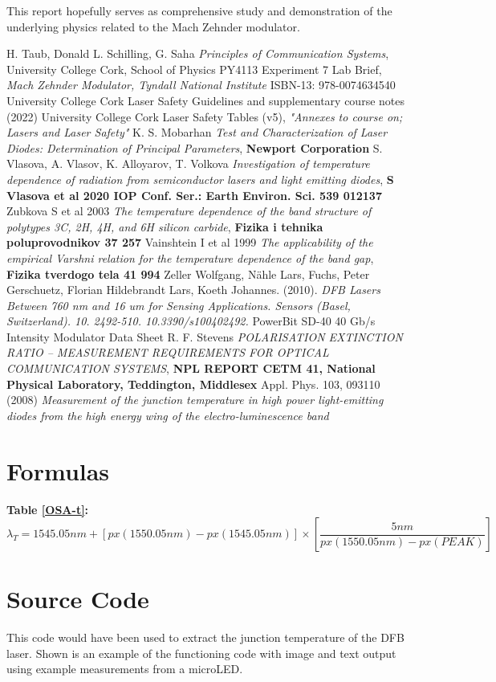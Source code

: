 \documentclass[12pt,a4paper]{report}
\begin{document}
This report hopefully serves as comprehensive study and demonstration of the underlying physics related to the Mach Zehnder modulator. 
\newpage
\vfill{}
\begin{thebibliography}{9}
 H. Taub, Donald L. Schilling, G. Saha \emph{Principles of Communication Systems}, 
 University College Cork, School of Physics PY4113 Experiment 7 Lab Brief, \emph{Mach Zehnder Modulator, Tyndall National Institute} ISBN-13: 978-0074634540
 University College Cork Laser Safety Guidelines and supplementary course notes (2022)
 University College Cork Laser Safety Tables (v5), \emph{"Annexes to course on; Lasers and Laser Safety"}
 K. S. Mobarhan \emph{Test and Characterization of Laser Diodes:
Determination of Principal Parameters}, \textbf{Newport Corporation}
 S. Vlasova, A. Vlasov, K. Alloyarov, T. Volkova \emph{Investigation of temperature dependence of
radiation from semiconductor lasers and light
emitting diodes}, \textbf{S Vlasova et al 2020 IOP Conf. Ser.: Earth Environ. Sci. 539 012137}
 Zubkova S et al 2003 \emph{The temperature dependence of the band structure of polytypes 3C, 2H,
4H, and 6H silicon carbide}, \textbf{Fizika i tehnika poluprovodnikov 37 257}
 Vainshtein I et al 1999 \emph{The applicability of the empirical Varshni relation for the temperature
dependence of the band gap}, \textbf{Fizika tverdogo tela 41 994}
 Zeller Wolfgang, Nähle Lars, Fuchs, Peter Gerschuetz, Florian  Hildebrandt Lars, Koeth Johannes. (2010). \emph{DFB Lasers Between 760 nm and 16 um for Sensing Applications. Sensors (Basel, Switzerland). 10. 2492-510. 10.3390/s100402492.}
 PowerBit SD-40 40 Gb/s Intensity Modulator Data Sheet
 R. F. Stevens \emph{POLARISATION EXTINCTION RATIO – MEASUREMENT
REQUIREMENTS FOR OPTICAL COMMUNICATION SYSTEMS}, \textbf{NPL REPORT CETM 41, National Physical Laboratory, Teddington, Middlesex}
 Appl. Phys. 103, 093110 (2008) \emph{Measurement of the junction temperature in high power light-emitting diodes from the high energy wing of the electro-luminescence band}
\end{thebibliography}
\newpage
\appendix
\chapter{Formulas}
\textbf{Table \ref{OSA-t}:}
\begin{equation}
    \lambda_T = 1545.05nm+[px(1550.05nm)-px(1545.05nm)]\times\left[\frac{5nm}{px(1550.05nm)-px(PEAK)}\right]
    \label{A.1}
\end{equation}

\chapter{Source Code}\label{code}
This code would have been used to extract the junction temperature of the DFB laser. Shown is an example of the functioning code with image and text output using example measurements from a microLED.

\end{document}
